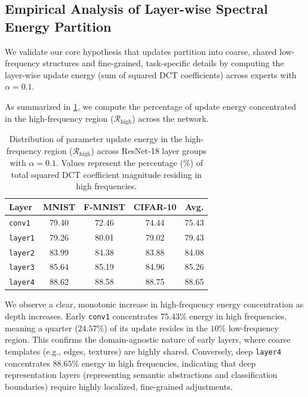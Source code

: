 \documentclass{article}
\theoremstyle{plain}
\theoremstyle{definition}
\theoremstyle{remark}
\begin{document}
\subsection{Empirical Analysis of Layer-wise Spectral Energy Partition}
We validate our core hypothesis that updates partition into coarse, shared low-frequency structures and fine-grained, task-specific details by computing the layer-wise update energy (sum of squared DCT coefficients) across experts with $\alpha=0.1$.

As summarized in \cref{tab:spectral_energy}, we compute the percentage of update energy concentrated in the high-frequency region ($\mathcal{R}_{\text{high}}$) across the network.

\begin{table}[tb]
\caption{Distribution of parameter update energy in the high-frequency region ($\mathcal{R}_{\text{high}}$) across ResNet-18 layer groups with $\alpha = 0.1$. Values represent the percentage (\%) of total squared DCT coefficient magnitude residing in high frequencies.}
\label{tab:spectral_energy}
\vskip 0.05in
\begin{center}
\begin{footnotesize}
\begin{tabular}{lcccc}
\toprule
Layer & MNIST & F-MNIST & CIFAR-10 & Avg. \\
\midrule
\texttt{conv1} & 79.40 & 72.46 & 74.44 & 75.43 \\
\texttt{layer1} & 79.26 & 80.01 & 79.02 & 79.43 \\
\texttt{layer2} & 83.99 & 84.38 & 83.88 & 84.08 \\
\texttt{layer3} & 85.64 & 85.19 & 84.96 & 85.26 \\
\texttt{layer4} & 88.62 & 88.58 & 88.75 & 88.65 \\
\bottomrule
\end{tabular}
\end{footnotesize}
\end{center}
\vskip -0.1in
\end{table}

We observe a clear, monotonic increase in high-frequency energy concentration as depth increases. Early \texttt{conv1} concentrates $75.43\%$ energy in high frequencies, meaning a quarter ($24.57\%$) of its update resides in the $10\%$ low-frequency region. This confirms the domain-agnostic nature of early layers, where coarse templates (e.g., edges, textures) are highly shared. Conversely, deep \texttt{layer4} concentrates $88.65\%$ energy in high frequencies, indicating that deep representation layers (representing semantic abstractions and classification boundaries) require highly localized, fine-grained adjustments.
\end{document}
